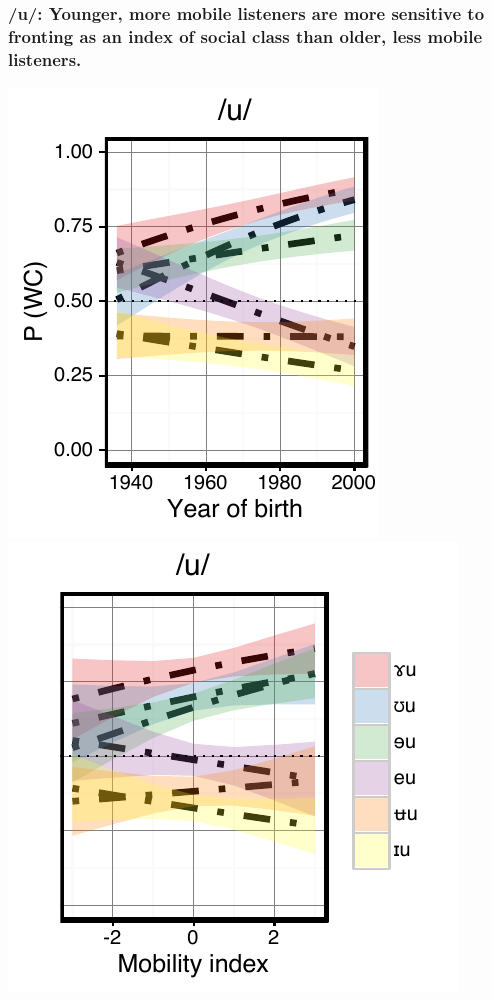 \documentclass[a0,final]{a0poster}
\begin{document}
\begin{multicols}{4}
\subsubsection*{/u/: Younger, more mobile listeners are more sensitive to fronting as an index of social class than older, less mobile listeners.}
\hspace*{-1.5cm}
\includegraphics[scale=2]{u_perception_age_sd.pdf}
\includegraphics[scale=2]{u_perception_dim3_sd.pdf}
\vspace*{-1.5cm}

\end{multicols}
\end{document}
